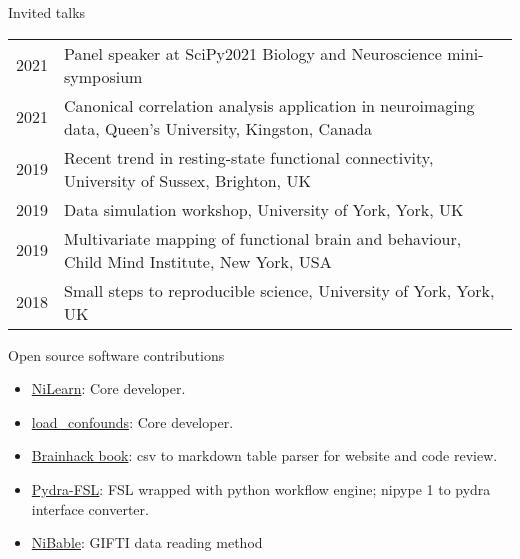 \documentclass{resume} %
\begin{document}

\begin{rSection}{Invited talks}
  \begin{tabular}{@{} l l @{\hspace{10ex}}}
    2021 & Panel speaker at SciPy2021 Biology and Neuroscience mini-symposium\\
  	2021 & Canonical correlation analysis application in neuroimaging data, Queen's University, Kingston, Canada\\
    2019 & Recent trend in resting-state functional connectivity, University of Sussex, Brighton, UK\\
    2019 & Data simulation workshop, University of York, York, UK\\
    2019 & Multivariate mapping of functional brain and behaviour, Child Mind Institute, New York, USA\\
    2018 & Small steps to reproducible science, University of York, York, UK\\
  \end{tabular}
\end{rSection}


\begin{rSection}{Open source software contributions}
  \begin{itemize}
      \item \href{https://github.com/nilearn/nilearn}{NiLearn}: Core developer.
      \item \href{https://github.com/SIMEXP/load_confounds}{load\_confounds}: Core developer.
      \item \href{https://github.com/brainhackorg/brainhack_jupyter_book}{Brainhack book}: csv to markdown table parser for website and code review.
      \item \href{https://github.com/nipype/pydra-fsl}{Pydra-FSL}: FSL wrapped with python workflow engine; nipype 1 to pydra interface converter.
      \item \href{https://github.com/nipy/nibabel/pull/793}{NiBable}: GIFTI data reading method
  \end{itemize}
\end{rSection}
\end{document}
